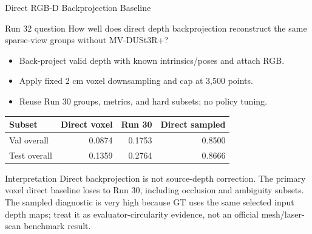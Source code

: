 \begin{frame}{Direct RGB-D Backprojection Baseline}
  \scriptsize
  \begin{block}{Run 32 question}
    How well does direct depth backprojection reconstruct the same sparse-view
    groups without MV-DUSt3R+?
  \end{block}

  \begin{itemize}
    \item Back-project valid depth with known intrinsics/poses and attach RGB.
    \item Apply fixed 2 cm voxel downsampling and cap at 3,500 points.
    \item Reuse Run 30 groups, metrics, and hard subsets; no policy tuning.
  \end{itemize}

  \centering
  \begin{tabular}{lrrr}
    \toprule
    \textbf{Subset} & \textbf{Direct voxel} & \textbf{Run 30} &
    \textbf{Direct sampled} \\
    \midrule
    Val overall & 0.0874 & 0.1753 & 0.8500 \\
    Test overall & 0.1359 & 0.2764 & 0.8666 \\
    \bottomrule
  \end{tabular}

  \vspace{0.08cm}
  \begin{alertblock}{Interpretation}
    Direct backprojection is not source-depth correction. The primary voxel
    direct baseline loses to Run 30, including occlusion and ambiguity subsets.
    The sampled diagnostic is very high because GT uses the same selected input
    depth maps; treat it as evaluator-circularity evidence, not an official
    mesh/laser-scan benchmark result.
  \end{alertblock}
\end{frame}

